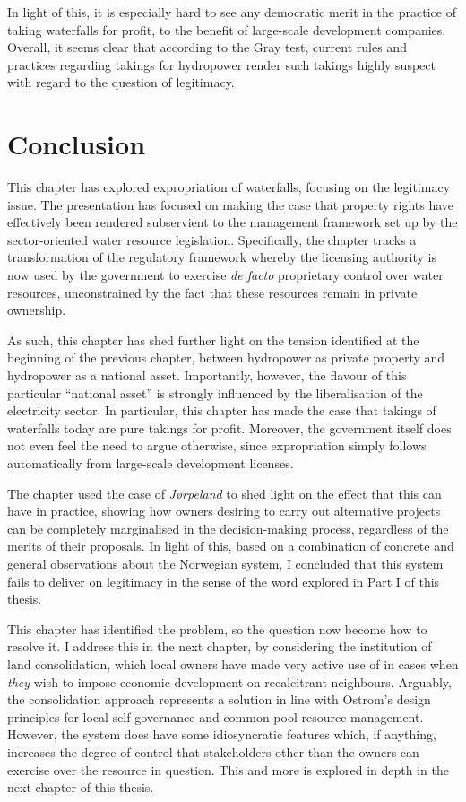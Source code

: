 In light of this, it is especially hard to see any democratic merit in the practice of taking waterfalls for profit, to the benefit of large-scale development companies. Overall, it seems clear that according to the Gray test, current rules and practices regarding takings for hydropower render such takings highly suspect with regard to the question of legitimacy.

\section{Conclusion}\label{sec:5:8}

This chapter has explored expropriation of waterfalls, focusing on the legitimacy issue. The presentation has focused on making the case that property rights have effectively been rendered subservient to the management framework set up by the sector-oriented water resource legislation. Specifically, the chapter tracks a transformation of the regulatory framework whereby the licensing authority is now used by the government to exercise {\it de facto} proprietary control over water resources, unconstrained by the fact that these resources remain in private ownership.

As such, this chapter has shed further light on the tension identified at the beginning of the previous chapter, between hydropower as private property and hydropower as a national asset. Importantly, however, the flavour of this particular ``national asset'' is strongly influenced by the liberalisation of the electricity sector. In particular, this chapter has made the case that takings of waterfalls today are pure takings for profit. Moreover, the government itself does not even feel the need to argue otherwise, since expropriation simply follows automatically from large-scale development licenses.

The chapter used the case of {\it Jørpeland} to shed light on the effect that this can have in practice, showing how owners desiring to carry out alternative projects can be completely marginalised in the decision-making process, regardless of the merits of their proposals. In light of this, based on a combination of concrete and general observations about the Norwegian system, I concluded that this system fails to deliver on legitimacy in the sense of the word explored in Part I of this thesis. 

This chapter has identified the problem, so the question now become how to resolve it. I address this in the next chapter, by considering the institution of land consolidation, which local owners have made very active use of in cases when {\it they} wish to impose economic development on recalcitrant neighbours. Arguably, the consolidation approach represents a solution in line with Ostrom's design principles for local self-governance and common pool resource management. However, the system does have some idiosyncratic features which, if anything, increases the degree of control that stakeholders other than the owners can exercise over the resource in question. This and more is explored in depth in the next chapter of this thesis.

